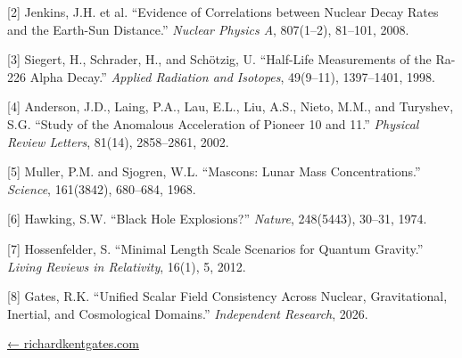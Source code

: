 \documentclass[
  10pt,
]{article}
\begin{document}
{[}2{]} Jenkins, J.H. et al. ``Evidence of Correlations between Nuclear
Decay Rates and the Earth-Sun Distance.'' \emph{Nuclear Physics A},
807(1--2), 81--101, 2008.

{[}3{]} Siegert, H., Schrader, H., and Schötzig, U. ``Half-Life
Measurements of the Ra-226 Alpha Decay.'' \emph{Applied Radiation and
Isotopes}, 49(9--11), 1397--1401, 1998.

{[}4{]} Anderson, J.D., Laing, P.A., Lau, E.L., Liu, A.S., Nieto, M.M.,
and Turyshev, S.G. ``Study of the Anomalous Acceleration of Pioneer 10
and 11.'' \emph{Physical Review Letters}, 81(14), 2858--2861, 2002.

{[}5{]} Muller, P.M. and Sjogren, W.L. ``Mascons: Lunar Mass
Concentrations.'' \emph{Science}, 161(3842), 680--684, 1968.

{[}6{]} Hawking, S.W. ``Black Hole Explosions?'' \emph{Nature},
248(5443), 30--31, 1974.

{[}7{]} Hossenfelder, S. ``Minimal Length Scale Scenarios for Quantum
Gravity.'' \emph{Living Reviews in Relativity}, 16(1), 5, 2012.

{[}8{]} Gates, R.K. ``Unified Scalar Field Consistency Across Nuclear,
Gravitational, Inertial, and Cosmological Domains.'' \emph{Independent
Research}, 2026.

\href{https://richardkentgates.com/}{← richardkentgates.com}
\end{document}
